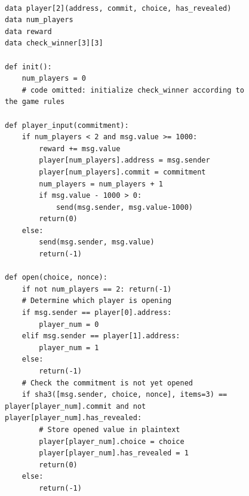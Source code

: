 \documentclass{llncs}
\begin{document}
\begin{figure}
\centering
\begin{minipage}{\columnwidth}%
\begin{mdframed}
\begin{verbatim}

data player[2](address, commit, choice, has_revealed)
data num_players
data reward
data check_winner[3][3]

def init():
	num_players = 0
	# code omitted: initialize check_winner according to the game rules

def player_input(commitment):
	if num_players < 2 and msg.value >= 1000:
		reward += msg.value
		player[num_players].address = msg.sender
		player[num_players].commit = commitment
		num_players = num_players + 1
		if msg.value - 1000 > 0:
			send(msg.sender, msg.value-1000)
		return(0)
	else:	
		send(msg.sender, msg.value)
		return(-1)
		
def open(choice, nonce):
	if not num_players == 2: return(-1)
	# Determine which player is opening
	if msg.sender == player[0].address:
		player_num = 0
	elif msg.sender == player[1].address:
		player_num = 1
	else:
		return(-1)
	# Check the commitment is not yet opened
	if sha3([msg.sender, choice, nonce], items=3) == player[player_num].commit and not player[player_num].has_revealed:
		# Store opened value in plaintext
		player[player_num].choice = choice
		player[player_num].has_revealed = 1		
		return(0)
	else:
		return(-1)
\end{verbatim}
\end{mdframed}
\end{minipage}
\end{figure}
%
%
\end{document}
